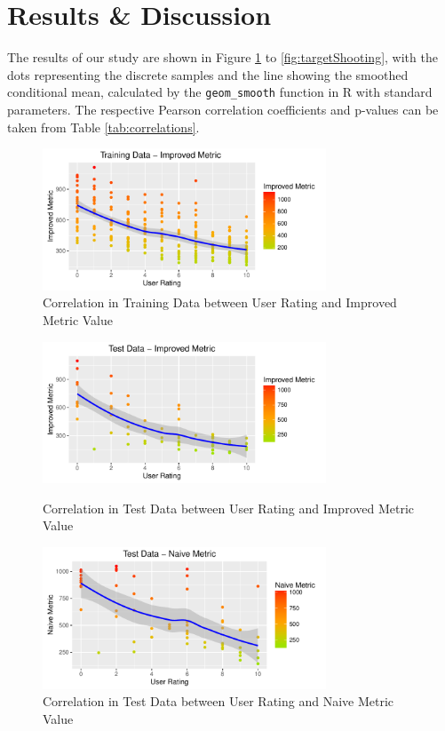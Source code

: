 \documentclass{sig-alternate-05-2015}
\begin{document}
\section{Results \& Discussion}

The results of our study are shown in Figure \ref{fig:trainingData} to \ref{fig:targetShooting}, with the dots representing the discrete samples and the line showing the smoothed conditional mean, calculated by the \texttt{geom\_smooth} function in R with standard parameters. The respective Pearson correlation coefficients and p-values can be taken from Table \ref{tab:correlations}.

\begin{figure}[b]
\centering
\includegraphics[width=8.45cm]{TrainingDataImproved}
\vspace{-20pt}
\caption{Correlation in Training Data between User Rating and Improved Metric Value}
\label{fig:trainingData}
\vspace{-10pt}
\end{figure}

\begin{figure}[t]
\centering
\includegraphics[width=8.45cm]{TestDataImproved}
\vspace{-20pt}
\caption{Correlation in Test Data between User Rating and Improved Metric Value}
\vspace{-10pt}
\label{fig:testData}

\includegraphics[width=8.45cm]{TestDataNaive}
\vspace{-20pt}
\caption{Correlation in Test Data between User Rating and Naive Metric Value}
\label{fig:testDataNaive}
\vspace{-20pt}
\end{figure}
\end{document}
